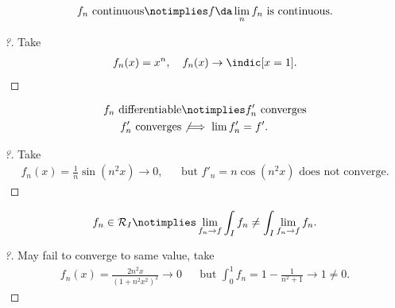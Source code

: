\begin{proposition}

\begin{align*}  
f_n \text{ continuous} \notimplies f\da \lim_n f_n \text{ is continuous}
.\end{align*}

\end{proposition}

\begin{proof}[?]

Take
\begin{align*}  
f_n(x) = x^n,\quad f_n(x) \to \indic[x = 1]
.\end{align*}

\end{proof}

\begin{proposition}

\begin{align*}  
f_n \text{ differentiable} &\notimplies  f'_n \text{ converges} \\
f'_n \text{ converges} &\not\implies \lim f'_n = f'
.\end{align*}

\end{proposition}

\begin{proof}[?]

Take
\begin{align*}  
f_n(x) = \frac{1}{n}\sin(n^2 x) \to 0,&& \text{but }
f'_n = n\cos(n^2 x) \text{ does not converge}
.\end{align*}

\end{proof}

\begin{proposition}[?]

\begin{align*}  
f_n\in \mathcal{R}_I \notimplies \lim_{f_n \to f} \int_I f_n \neq \int_I \lim_{f_n \to f} f_n
.\end{align*}

\end{proposition}

\begin{proof}[?]

May fail to converge to same value, take
\begin{align*}  
f_n(x) = \frac{2n^2x}{(1+n^2x^2)^2} \to 0 && \text{but }\int_0^1 f_n = 1 - \frac{1}{n^2 + 1} \to 1\neq 0
.\end{align*}

\end{proof}

